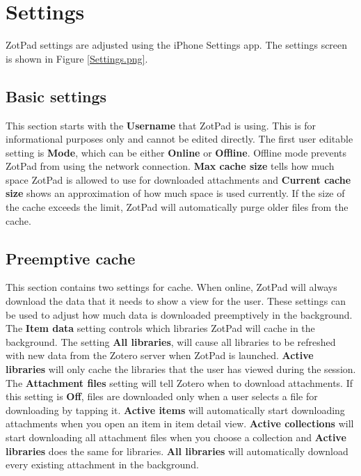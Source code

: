 \documentclass[oneside, openany, 12pt]{tufte-book}
\newcommand{\iphone}[1]{#1}
\newcommand{\ipad}[1]{}
\newcommand{\image}[2]{
	\center
	\fbox{\texttt{[image: images/iPhone/\{\#2]}}}

	\refstepcounter{figure}
	\smallskip\noindent\small Figure \thefigure: #1
	\label{#2}
	}
\newcommand{\iphone}[1]{}
\newcommand{\ipad}[1]{#1}
\newcommand{\image}[2]{
	\caption{#1}
	\label{#2}
	\fbox{\texttt{[image: images/iPad/\{\#2]}}}
	}
\begin{document}
\begin{figure}
\image{Conflict resolution}{Conflict.png}
\end{figure}

\clearpage

\chapter{Settings}

ZotPad settings are adjusted using the \ipad{iPad}\iphone{iPhone} Settings app. The settings screen is shown in Figure \ref{Settings.png}. 

\section{Basic settings}

This section starts with the \textbf{Username} that ZotPad is using. This is for informational purposes only and cannot be edited directly. The first user editable setting is \textbf{Mode}, which can be either \textbf{Online} or \textbf{Offline}. Offline mode prevents ZotPad from using the network connection. \textbf{Max cache size} tells how much space ZotPad is allowed to use for downloaded attachments and \textbf{Current cache size} shows an approximation of how much space is used currently. If the size of the cache exceeds the limit, ZotPad will automatically purge older files from the cache.

\begin{figure}
\image{ZotPad settings}{Settings.png}
\end{figure}

\section{Preemptive cache}

 This section contains two settings for cache. When online, ZotPad will always download the data that it needs to show a view for the user. These settings can be used to adjust how much data is downloaded preemptively in the background. The \textbf{Item data} setting controls which libraries ZotPad will cache in the background. The setting \textbf{All libraries}, will cause all libraries to be refreshed with new data from the Zotero server when ZotPad is launched. \textbf{Active libraries} will only cache the libraries that the user has viewed during the session. The \textbf{Attachment files} setting will tell Zotero when to download attachments. If this setting is \textbf{Off}, files are downloaded only when a user selects a file for downloading by tapping it. \textbf{Active items} will automatically start downloading attachments when you open an item in item detail view. \textbf{Active collections} will start downloading all attachment files when you choose a collection and \textbf{Active libraries} does the same for libraries. \textbf{All libraries} will automatically download every existing attachment in the background.
\end{document}
